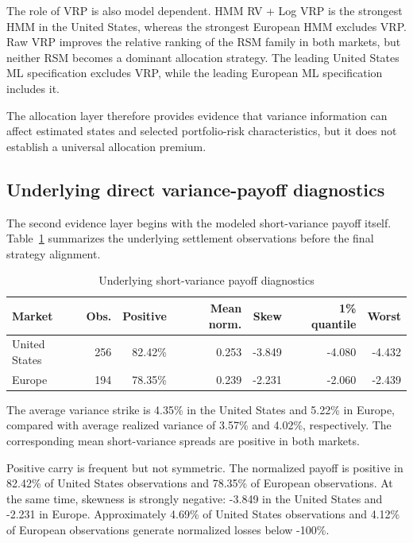 The role of VRP is also model dependent. HMM RV + Log VRP is the strongest HMM in the United States, whereas the strongest European HMM excludes VRP. Raw VRP improves the relative ranking of the RSM family in both markets, but neither RSM becomes a dominant allocation strategy. The leading United States ML specification excludes VRP, while the leading European ML specification includes it.

The allocation layer therefore provides evidence that variance information can affect estimated states and selected portfolio-risk characteristics, but it does not establish a universal allocation premium.



\subsection{Underlying direct variance-payoff diagnostics}

The second evidence layer begins with the modeled short-variance payoff itself. Table~\ref{tab:payoff_diag} summarizes the underlying settlement observations before the final strategy alignment.

\begin{table}[htbp]
\centering
\small
\caption{Underlying short-variance payoff diagnostics}
\label{tab:payoff_diag}
\begin{tabularx}{\textwidth}{Xrrrrrr}
\toprule
Market
& Obs.
& Positive
& Mean norm.
& Skew
& 1\% quantile
& Worst \\
\midrule
United States
& 256
& 82.42\%
& 0.253
& -3.849
& -4.080
& -4.432 \\
Europe
& 194
& 78.35\%
& 0.239
& -2.231
& -2.060
& -2.439 \\
\bottomrule
\end{tabularx}
\end{table}

The average variance strike is 4.35\% in the United States and 5.22\% in Europe, compared with average realized variance of 3.57\% and 4.02\%, respectively. The corresponding mean short-variance spreads are positive in both markets.

Positive carry is frequent but not symmetric. The normalized payoff is positive in 82.42\% of United States observations and 78.35\% of European observations. At the same time, skewness is strongly negative: -3.849 in the United States and -2.231 in Europe. Approximately 4.69\% of United States observations and 4.12\% of European observations generate normalized losses below -100\%.

